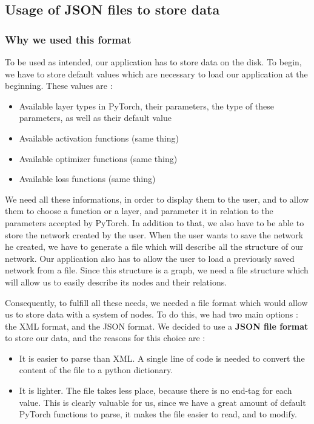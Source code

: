 \subsection{Usage of JSON files to store data}
\subsubsection{Why we used this format}
To be used as intended, our application has to store data on the disk.
\newline To begin, we have to store default values which are necessary to load our application at the beginning. These values are :
\begin{itemize}
    \item Available layer types in PyTorch, their parameters, the type of these parameters, as well as their default value
    \item Available activation functions (same thing)
    \item Available optimizer functions (same thing)
    \item Available loss functions (same thing)
\end{itemize}
We need all these informations, in order to display them to the user, and to allow them to choose a function or a layer, and parameter it in relation to the parameters accepted by PyTorch.
\newline In addition to that, we also have to be able to store the network created by the user. When the user wants to save the network he created, we have to generate a file which will describe all the structure of our network. Our application also has to allow the user to load a previously saved network from a file. Since this structure is a graph, we need a file structure which will allow us to easily describe its nodes and their relations.

Consequently, to fulfill all these needs, we needed a file format which would allow us to store data with a system of nodes. To do this, we had two main options : the XML format, and the JSON format. We decided to use a \textbf{JSON file format} to store our data, and the reasons for this choice are :
\begin{itemize}
    \item It is easier to parse than XML. A single line of code is needed to convert the content of the file to a python dictionary.
    \item It is lighter. The file takes less place, because there is no end-tag for each value. This is clearly valuable for us, since we have a great amount of default PyTorch functions to parse, it makes the file easier to read, and to modify.
\end{itemize}
